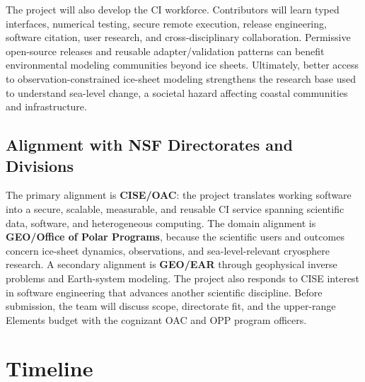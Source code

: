 The project will also develop the CI workforce. Contributors will learn typed
interfaces, numerical testing, secure remote execution, release engineering,
software citation, user research, and cross-disciplinary collaboration.
Permissive open-source releases and reusable adapter/validation patterns can
benefit environmental modeling communities beyond ice sheets. Ultimately,
better access to observation-constrained ice-sheet modeling strengthens the
research base used to understand sea-level change, a societal hazard affecting
coastal communities and infrastructure.

\subsection{Alignment with NSF Directorates and Divisions}

The primary alignment is \textbf{CISE/OAC}: the project translates working
software into a secure, scalable, measurable, and reusable CI service spanning
scientific data, software, and heterogeneous computing. The domain alignment is
\textbf{GEO/Office of Polar Programs}, because the scientific users and
outcomes concern ice-sheet dynamics, observations, and sea-level-relevant
cryosphere research. A secondary alignment is \textbf{GEO/EAR} through
geophysical inverse problems and Earth-system modeling. The project also
responds to CISE interest in software engineering that advances another
scientific discipline. Before submission, the team will discuss scope,
directorate fit, and the upper-range Elements budget with the cognizant OAC and
OPP program officers.

\section{Timeline}
\label{sec:timeline}

